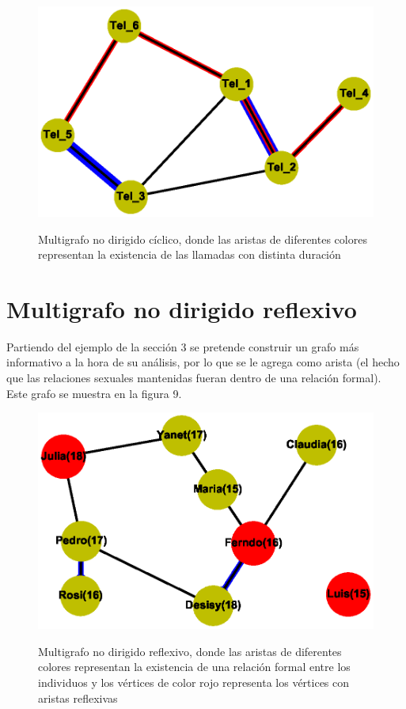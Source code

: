 \documentclass{article}
\begin{document}
\begin{center}

\end{center}
\begin{figure}[h]
\begin{center}
\includegraphics[scale=0.7]{Graf8.eps}\\
\caption{Multigrafo no dirigido cíclico, donde las aristas de diferentes colores representan la existencia de las llamadas con distinta duración}
\end{center}
\end{figure}
\section{Multigrafo no dirigido reflexivo}
Partiendo del ejemplo de la sección 3 se pretende construir un grafo más informativo a la hora de su análisis, por lo que se le agrega como arista (el hecho que las relaciones sexuales mantenidas fueran dentro de una relación formal). Este grafo se muestra en la figura 9.
\begin{center}

\end{center}
\begin{figure}[h]
\begin{center}
\includegraphics[scale=0.7]{Graf9.eps}\\
\caption{Multigrafo no dirigido reflexivo, donde las aristas de diferentes colores representan la existencia de una relación formal entre los individuos y los vértices de color rojo representa los vértices con aristas reflexivas}
\end{center}
\end{figure}
\end{document}
